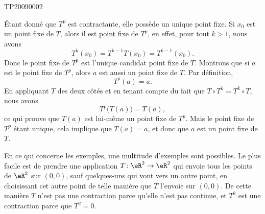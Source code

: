 
\begin{corrige}{TP20090002}

	Étant donné que $T^p$ est contractante, elle possède un unique point fixe. Si $x_0$ est un point fixe de $T$, alors il est point fixe de $T^p$, en effet, pour tout $k>1$, nous avons
	\begin{equation}
		T^k(x_0)=T^{k-1}T(x_0)=T^{k-1}(x_0).
	\end{equation}
	Donc le point fixe de $T^p$ est l'unique candidat point fixe de $T$. Montrons que si $a$ est le point fixe de $T^p$, alors $a$ est aussi un point fixe de $T$. Par définition,
	\begin{equation}
		T^p(a)=a.
	\end{equation}
	En appliquant $T$ des deux côtés et en tenant compte du fait que $T\circ T^k=T^k\circ T$, nous avons
	\begin{equation}
		T^p\big( T(a) \big)=T(a),
	\end{equation}
	ce qui prouve que $T(a)$ est lui-même un point fixe de $T^p$. Mais le point fixe de $T^p$ étant unique, cela implique que $T(a)=a$, et donc que $a$ est un point fixe de $T$.

	En ce qui concerne les exemples, une multitude d'exemples sont possibles. Le plus facile est de prendre une application $T\colon \eR^2\to \eR^2$ qui envoie tous les points de $\eR^2$ sur $(0,0)$, sauf quelques-uns qui vont vers un autre point, en choisissant cet autre point de telle manière que $T$ l'envoie sur $(0,0)$. De cette manière $T$ n'est pas une contraction parce qu'elle n'est pas continue, et $T^2$ est une contraction parce que $T^2=0$.

\end{corrige}
